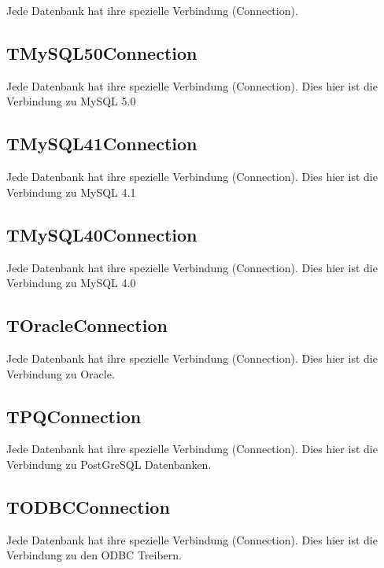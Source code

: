 Jede Datenbank hat ihre spezielle Verbindung (Connection).

\subsection{TMySQL50Connection}
Jede Datenbank hat ihre spezielle Verbindung (Connection). Dies hier ist die Verbindung zu MySQL 5.0

\subsection{TMySQL41Connection}
Jede Datenbank hat ihre spezielle Verbindung (Connection). Dies hier ist die Verbindung zu MySQL 4.1

\subsection{TMySQL40Connection}
Jede Datenbank hat ihre spezielle Verbindung (Connection). Dies hier ist die Verbindung zu MySQL 4.0

\subsection{TOracleConnection}
Jede Datenbank hat ihre spezielle Verbindung (Connection). Dies hier ist die Verbindung zu Oracle.

\subsection{TPQConnection}
Jede Datenbank hat ihre spezielle Verbindung (Connection). Dies hier ist die Verbindung zu PostGreSQL Datenbanken.

\subsection{TODBCConnection}
Jede Datenbank hat ihre spezielle Verbindung (Connection). Dies hier ist die Verbindung zu den ODBC Treibern.

